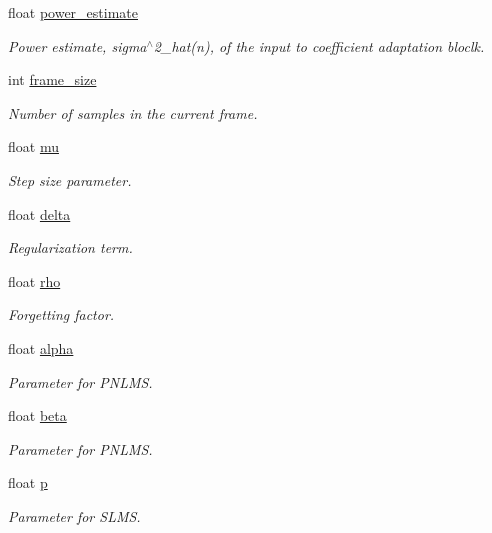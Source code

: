 \begin{DoxyCompactItemize}
float \mbox{\hyperlink{structafc__t_ab94a0e3f15733272ecd739279e132818}{power\+\_\+estimate}}
\begin{DoxyCompactList}\small\item\em Power estimate, sigma$^\wedge$2\+\_\+hat(n), of the input to coefficient adaptation bloclk. \end{DoxyCompactList}\item 
int \mbox{\hyperlink{structafc__t_acb59e5af368aca0b2840fa76e5e5a000}{frame\+\_\+size}}
\begin{DoxyCompactList}\small\item\em Number of samples in the current frame. \end{DoxyCompactList}\item 
float \mbox{\hyperlink{structafc__t_a7b343e47789c5a03ba4a37671c281861}{mu}}
\begin{DoxyCompactList}\small\item\em Step size parameter. \end{DoxyCompactList}\item 
float \mbox{\hyperlink{structafc__t_a472432ba992e61143df0a1ab83981c10}{delta}}
\begin{DoxyCompactList}\small\item\em Regularization term. \end{DoxyCompactList}\item 
float \mbox{\hyperlink{structafc__t_a8edae5604a2d189f1e83b71678566cad}{rho}}
\begin{DoxyCompactList}\small\item\em Forgetting factor. \end{DoxyCompactList}\item 
float \mbox{\hyperlink{structafc__t_a161775274c257b1d804c61b77cfbbbd7}{alpha}}
\begin{DoxyCompactList}\small\item\em Parameter for P\+N\+L\+MS. \end{DoxyCompactList}\item 
float \mbox{\hyperlink{structafc__t_a829042affbb45e80df502fc95134b673}{beta}}
\begin{DoxyCompactList}\small\item\em Parameter for P\+N\+L\+MS. \end{DoxyCompactList}\item 
float \mbox{\hyperlink{structafc__t_ae93bcaea87a0f75300fc91ea8d50b2ad}{p}}
\begin{DoxyCompactList}\small\item\em Parameter for S\+L\+MS. \end{DoxyCompactList}\item 

\end{DoxyCompactItemize}
